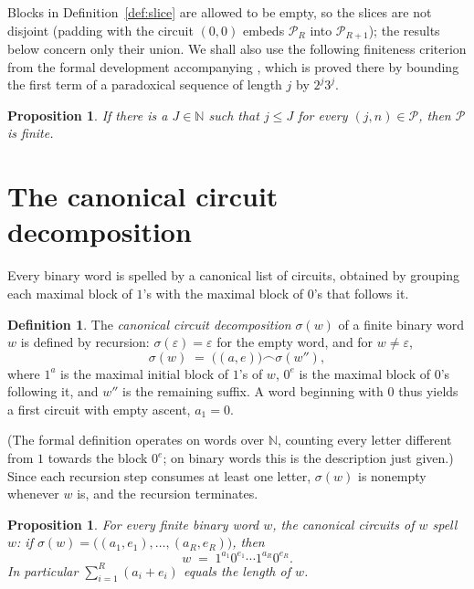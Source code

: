 \documentclass[11pt]{amsart}
\theoremstyle{plain}
\newtheorem{proposition}[theorem]{Proposition}
\theoremstyle{definition}
\newtheorem{definition}[theorem]{Definition}
\theoremstyle{remark}
\newcommand{\N}{\mathbb{N}}
\newcommand{\Par}{\mathcal{P}}        %
\newcommand{\ParR}[1]{\Par_{#1}}      %
\begin{document}
Blocks in Definition~\ref{def:slice} are allowed to be empty, so the slices
are not disjoint (padding with the circuit $(0,0)$ embeds $\ParR{R}$ into
$\ParR{R+1}$); the results below concern only their union.  We shall also use
the following finiteness criterion from the formal development accompanying
\cite{Roz25}, which is proved there by bounding the first term of a
paradoxical sequence of length $j$ by $2^{j}3^{j}$.

\begin{proposition}\label{prop:lengthbound}
If there is a $J\in\N$ such that $j\le J$ for every $(j,n)\in\Par$, then
$\Par$ is finite.
\end{proposition}

\section{The canonical circuit decomposition}\label{sec:canonical}

Every binary word is spelled by a canonical list of circuits, obtained by
grouping each maximal block of $1$'s with the maximal block of $0$'s that
follows it.

\begin{definition}\label{def:shape}
The \emph{canonical circuit decomposition} $\sigma(w)$ of a finite binary
word $w$ is defined by recursion: $\sigma(\varepsilon)=\varepsilon$ for the
empty word, and for $w\neq\varepsilon$,
\[
\sigma(w) \;=\; \bigl((a,e)\bigr) \frown \sigma(w''),
\]
where $1^{a}$ is the maximal initial block of $1$'s of $w$, $0^{e}$ is the
maximal block of $0$'s following it, and $w''$ is the remaining suffix.  A
word beginning with $0$ thus yields a first circuit with empty ascent,
$a_1=0$.
\end{definition}

(The formal definition operates on words over $\N$, counting every letter
different from $1$ towards the block $0^{e}$; on binary words this is the
description just given.)  Since each recursion step consumes at least one
letter, $\sigma(w)$ is nonempty whenever $w$ is, and the recursion
terminates.

\begin{proposition}\label{prop:roundtrip}
For every finite binary word $w$, the canonical circuits of $w$ spell $w$:
if $\sigma(w)=\bigl((a_1,e_1),\dots,(a_R,e_R)\bigr)$, then
\[
w \;=\; 1^{a_1}0^{e_1}\cdots 1^{a_R}0^{e_R}.
\]
In particular $\sum_{i=1}^{R}(a_i+e_i)$ equals the length of $w$.
\end{proposition}
\end{document}
